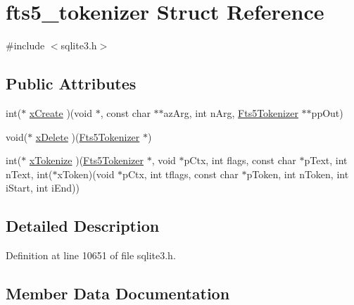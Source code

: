 \hypertarget{structfts5__tokenizer}{}\section{fts5\+\_\+tokenizer Struct Reference}
\label{structfts5__tokenizer}


{\ttfamily \#include $<$sqlite3.\+h$>$}

\subsection*{Public Attributes}
\begin{DoxyCompactItemize}
\item 
int($\ast$ \mbox{\hyperlink{structfts5__tokenizer_a61846ad000b2d38a1264c342c8201d5c}{x\+Create}} )(void $\ast$, const char $\ast$$\ast$az\+Arg, int n\+Arg, \mbox{\hyperlink{sqlite3_8h_ac015f88c5332d612a3125fc0014e468c}{Fts5\+Tokenizer}} $\ast$$\ast$pp\+Out)
\item 
void($\ast$ \mbox{\hyperlink{structfts5__tokenizer_aaaa88b9f3e50f0b1120a05fb1bbb251f}{x\+Delete}} )(\mbox{\hyperlink{sqlite3_8h_ac015f88c5332d612a3125fc0014e468c}{Fts5\+Tokenizer}} $\ast$)
\item 
int($\ast$ \mbox{\hyperlink{structfts5__tokenizer_ae65ca5a9b1e6d5c1ef09731fccefa577}{x\+Tokenize}} )(\mbox{\hyperlink{sqlite3_8h_ac015f88c5332d612a3125fc0014e468c}{Fts5\+Tokenizer}} $\ast$, void $\ast$p\+Ctx, int flags, const char $\ast$p\+Text, int n\+Text, int($\ast$x\+Token)(void $\ast$p\+Ctx, int tflags, const char $\ast$p\+Token, int n\+Token, int i\+Start, int i\+End))
\end{DoxyCompactItemize}


\subsection{Detailed Description}


Definition at line 10651 of file sqlite3.\+h.



\subsection{Member Data Documentation}
\mbox{\label{structfts5__tokenizer_a61846ad000b2d38a1264c342c8201d5c}} 
